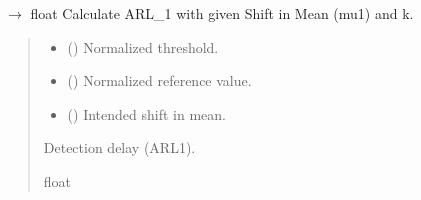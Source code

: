 \documentclass[letterpaper,10pt,oneside,english]{sphinxmanual}
\begin{document}
\begin{fulllineitems}
\label{\detokenize{ref_theoretical:package.ARLTheoretical.get_ARL_1_h_mu1_k}}
\pysigstartsignatures
\pysiglinewithargsret
{}
{\sphinxparamcomma {}\sphinxparamcomma {}}
{{ $\rightarrow$ float}}
\pysigstopsignatures
\sphinxAtStartPar
Calculate ARL\_1 with given Shift in Mean (mu1) and k.
\begin{quote}\begin{description}
\begin{itemize}
\item {} 
\sphinxAtStartPar
{} () \textendash{} Normalized threshold.

\item {} 
\sphinxAtStartPar
{} () \textendash{} Normalized reference value.

\item {} 
\sphinxAtStartPar
{} () \textendash{} Intended shift in mean.

\end{itemize}

\sphinxAtStartPar
Detection delay (ARL1).

\sphinxAtStartPar
float

\end{description}\end{quote}

\end{fulllineitems}

\end{document}
